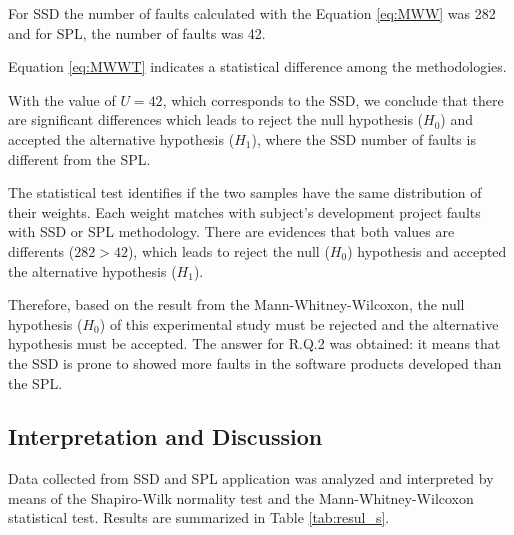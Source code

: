 \begin{itemize}
\begin{itemize}
	\end{itemize}	

For SSD the number of faults calculated with the Equation \ref{eq:MWW} was 282 and for SPL, the number of faults was 42.



Equation \ref{eq:MWWT} indicates a statistical difference among the methodologies.







With the value of $U=42$, which corresponds to the SSD, we conclude that there are significant differences which leads to reject the null hypothesis ($H_0$) and accepted the alternative hypothesis ($H_{1}$), where the SSD number of faults is different from the SPL.




The statistical test identifies if the two samples have the same distribution of their weights. Each weight matches with subject's development project faults with SSD or SPL methodology. There are evidences that both values are differents ($282>42$), which leads to reject the null ($H_0$) hypothesis and accepted the alternative hypothesis ($H_{1}$).

Therefore, based on the result from the Mann-Whitney-Wilcoxon, the null hypothesis ($ H_0 $) of this experimental study must be rejected and the alternative hypothesis must be accepted. The answer for R.Q.2 was obtained: it means that the SSD is prone to showed more faults in the software products developed than the SPL.




\end{itemize}







\subsection{Interpretation and Discussion}\label{sub:interpretation}

Data collected from SSD and SPL application was analyzed and interpreted by means of the Shapiro-Wilk normality test and the Mann-Whitney-Wilcoxon statistical test. %
Results are summarized in Table \ref{tab:resul_s}.




